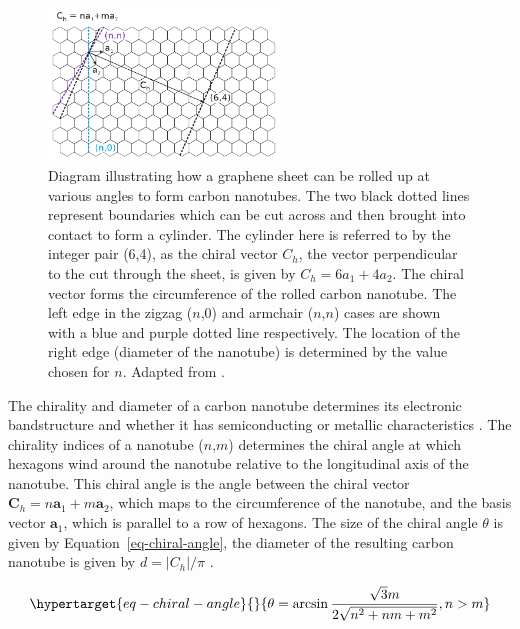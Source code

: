 \documentclass[
  a4paper,
]{scrbook}
\begin{document}
\begin{figure}

{\centering \includegraphics[width=0.55\textwidth,height=\textheight]{figures/ch2/carbon_nanotube_wrapping.png}

}

\caption{\label{fig-carbon-nanotube-wrapping}Diagram illustrating how a
graphene sheet can be rolled up at various angles to form carbon
nanotubes. The two black dotted lines represent boundaries which can be
cut across and then brought into contact to form a cylinder. The
cylinder here is referred to by the integer pair (6,4), as the chiral
vector \(C_h\), the vector perpendicular to the cut through the sheet,
is given by \(C_h = 6a_1+4a_2\). The chiral vector forms the
circumference of the rolled carbon nanotube. The left edge in the zigzag
(\(n\),0) and armchair (\(n\),\(n\)) cases are shown with a blue and
purple dotted line respectively. The location of the right edge
(diameter of the nanotube) is determined by the value chosen for \(n\).
Adapted from \autocite{Dekker1999,Lu2012}.}

\end{figure}

The chirality and diameter of a carbon nanotube determines its
electronic bandstructure and whether it has semiconducting or metallic
characteristics
\autocite{Martel1998,Dekker1999,McEuen2002,Avouris2007,Shkodra2021,Li2023}.
The chirality indices of a nanotube (\(n\),\(m\)) determines the chiral
angle at which hexagons wind around the nanotube relative to the
longitudinal axis of the nanotube. This chiral angle is the angle
between the chiral vector
\(\textbf{C}_h = n\textbf{a}_1+m\textbf{a}_2\), which maps to the
circumference of the nanotube, and the basis vector \(\textbf{a}_1\),
which is parallel to a row of hexagons. The size of the chiral angle
\(\theta\) is given by Equation~\ref{eq-chiral-angle}, the diameter of
the resulting carbon nanotube is given by \(d=|C_h|/\pi\)
\autocite{Lu2012}.

\begin{equation}\protect\hypertarget{eq-chiral-angle}{}{
\theta = \arcsin\frac{\sqrt{3}m}{2\sqrt{n^2+nm+m^2}}, \space n > m
}\label{eq-chiral-angle}\end{equation}
\end{document}
